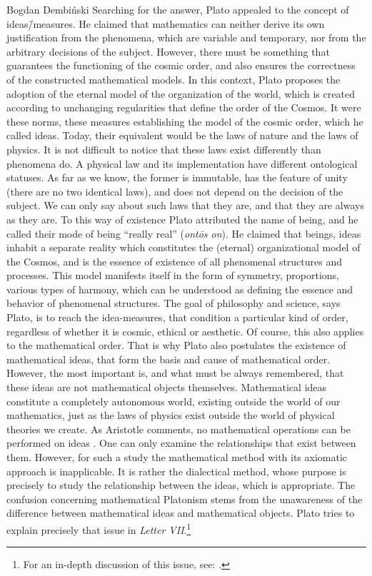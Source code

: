 \begin{artengenv}{Bogdan Dembiński}
Searching for the answer, Plato appealed to the concept of ideas\=/measures. He claimed that mathematics can neither
derive its own justification from the phenomena, which are variable and temporary, nor from the arbitrary decisions of
the subject. However, there must be something that guarantees the functioning of the cosmic order, and also ensures the
correctness of the constructed mathematical models. In this context, Plato proposes the %
adoption of the eternal model of the organization of the world, which is created according to unchanging regularities
that define the order of the Cosmos. It were these norms, these measures establishing the model of the cosmic order,
which he called ideas. Today, their equivalent would be the laws of nature and the laws of physics. It is not difficult
to notice that these laws exist differently than phenomena do. A physical law and its implementation have different
ontological statuses. As far as we know, the former is immutable, has the feature of unity (there are no two identical
laws), and does not depend on the decision of the subject. We can only say about such laws that they are, and that they
are always as they are. To this way of existence Plato attributed the name of being, and he called
their mode of being ``really real'' (\textit{ont\=os on}). He claimed that beings, ideas inhabit a separate
reality which constitutes the (eternal) organizational model of the Cosmos, and is the essence of existence of all
phenomenal structures and processes. This model manifests itself in the form of symmetry, proportions, various types of
harmony, which can be understood as defining the essence and behavior of phenomenal structures. The goal of philosophy
and science, says Plato, is to reach the idea-measures, that condition a particular kind of order, regardless of
whether it is cosmic, ethical or aesthetic. Of course, this also applies to the mathematical order. That is why Plato
also postulates the existence of mathematical ideas, that form the basis and cause of mathematical order. However, the
most important is, and what must be always remembered, that these ideas are not mathematical objects themselves.
Mathematical ideas constitute a completely autonomous world, existing outside the world of our mathematics, just as the
laws of physics exist outside the world of physical theories we create. As Aristotle comments, no mathematical
operations can be performed on ideas
\parencite[\textit{Metaphysics}, 1081a]{aristotle_aristotles_1924}.
One can only
examine the relationships that exist between them. However, for such a study the mathematical method with its axiomatic
approach is inapplicable. It is rather the dialectical method, whose purpose is precisely to study the relationship
between the ideas, which is appropriate. The confusion concerning mathematical Platonism stems from the unawareness of the
difference between mathematical ideas and mathematical objects. Plato tries to explain precisely that issue in
\textit{Letter VII}.\footnote{For an in-depth discussion of this issue, see:
\parencite[pp.55–110]{dembinski_pozna_2003}.
}


\end{artengenv}
